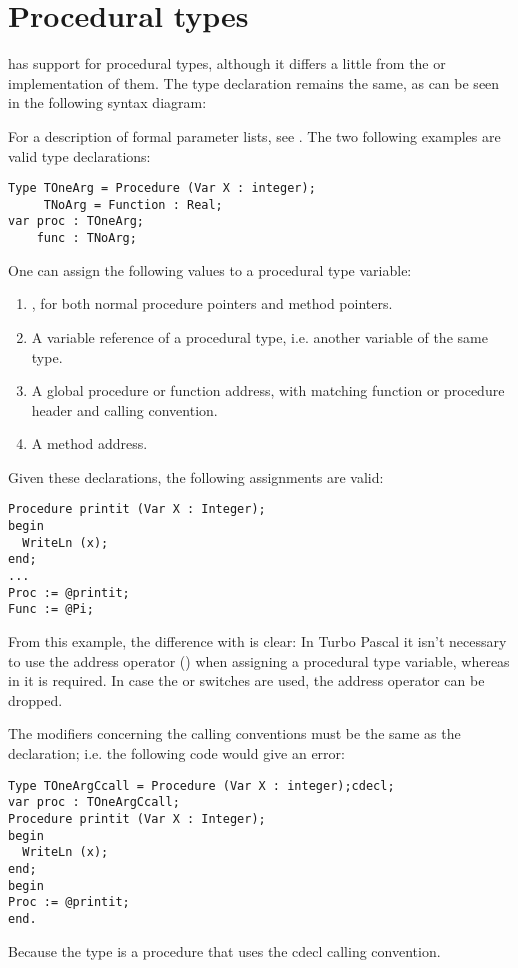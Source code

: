 \section{Procedural types}
\fpc has support for procedural types, although it differs a little from
the \tp or \delphi implementation of them. The type declaration remains the
same, as can be seen in the following syntax diagram:

For a description of formal parameter lists, see .
The two following examples are valid type declarations:
\begin{verbatim}
Type TOneArg = Procedure (Var X : integer);
     TNoArg = Function : Real;
var proc : TOneArg;
    func : TNoArg;
\end{verbatim}
One can assign the following values to a procedural type variable:
\begin{enumerate}
\item {}, for both normal procedure pointers and method pointers.
\item A variable reference of a procedural type, i.e. another variable of
the same type.
\item A global procedure or function address, with matching function or
procedure header and calling convention.
\item A method address.
\end{enumerate}
Given these declarations, the following assignments are valid:
\begin{verbatim}
Procedure printit (Var X : Integer);
begin
  WriteLn (x);
end;
...
Proc := @printit;
Func := @Pi;
\end{verbatim}
From this example, the difference with \tp is clear: In Turbo
Pascal it isn't necessary to use the address operator ()
when assigning a procedural type variable, whereas in \fpc it is required.
In case the  or  switches are used, the address
operator can be dropped.
\begin{remark} The modifiers concerning the calling conventions
must be the same as the declaration;
i.e. the following code would give an error:
\begin{verbatim}
Type TOneArgCcall = Procedure (Var X : integer);cdecl;
var proc : TOneArgCcall;
Procedure printit (Var X : Integer);
begin
  WriteLn (x);
end;
begin
Proc := @printit;
end.
\end{verbatim}
Because the  type is a procedure that uses the cdecl
calling convention.
\end{remark}

